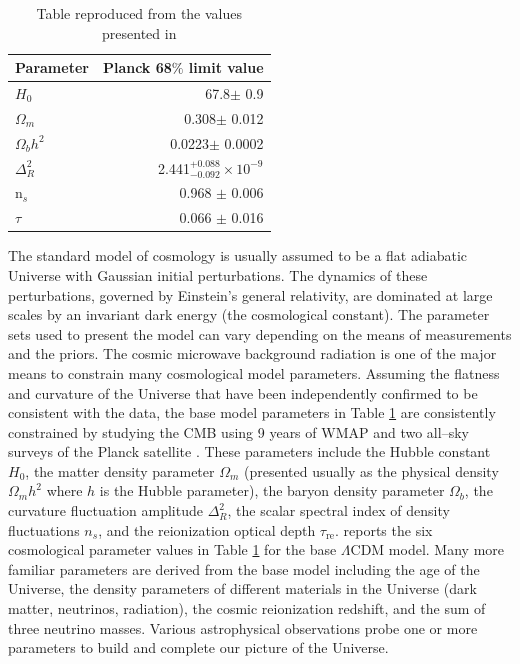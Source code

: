\documentclass[a4wide,12pt]{book}
\begin{document}
\begin{table}
\begin{tabular}{l{}r}
Parameter & Planck 68$\%$ limit value \\
\hline
$H_0$ & 67.8$\pm$ 0.9 \\
$\Omega_m$ & 0.308$\pm$ 0.012 \\
$\Omega_b h^2$ & 0.0223$\pm$ 0.0002 \\
$\Delta^2_R$ & 2.441$^{+0.088}_{-0.092} \times 10^{-9}$ \\
n$_s$ & 0.968 $\pm$ 0.006\\
$\tau$ & 0.066 $\pm$ 0.016\\
\end{tabular}
\caption[Table caption text]{Table reproduced from the values presented in \citet[][]{Planck2015}}
\label{tab:LCDM_Planck15}
\end{table}

The standard model of cosmology is usually assumed to be a flat adiabatic Universe with Gaussian initial perturbations. The dynamics of these perturbations, governed by Einstein's general relativity, are dominated at large scales by an invariant dark energy (the cosmological constant). The parameter sets used to present the model can vary depending on the means of measurements and the priors.  The cosmic microwave background radiation is one of the major means to constrain many cosmological model parameters. Assuming the flatness and curvature of the Universe that have been independently confirmed to be consistent with the data, the base model parameters in Table \ref{tab:LCDM_Planck15} are consistently constrained by studying the CMB using 9 years of WMAP \citep[][]{WMAP9} and two all--sky surveys of the Planck satellite \citep[][]{Planck2015}. These parameters include the Hubble constant $H_0$, the matter density parameter $\Omega_m$ (presented usually as the physical density $\Omega_m h^2$ where $h$ is the Hubble parameter), the baryon density parameter $\Omega_b$, the curvature fluctuation amplitude $\Delta^2_R$, the scalar spectral index of density fluctuations $n_s$, and the reionization optical depth $\tau_\mathrm{re}$. \citet[][]{Planck2015} reports the six cosmological parameter values in Table \ref{tab:LCDM_Planck15} for the base $\Lambda$CDM model. Many more familiar parameters are derived from the base model including the age of the Universe, the density parameters of different materials in the Universe (dark matter, neutrinos, radiation), the cosmic reionization redshift, and the sum of three neutrino masses. Various astrophysical observations probe one or more parameters to build and complete our picture of the Universe.
\end{document}
